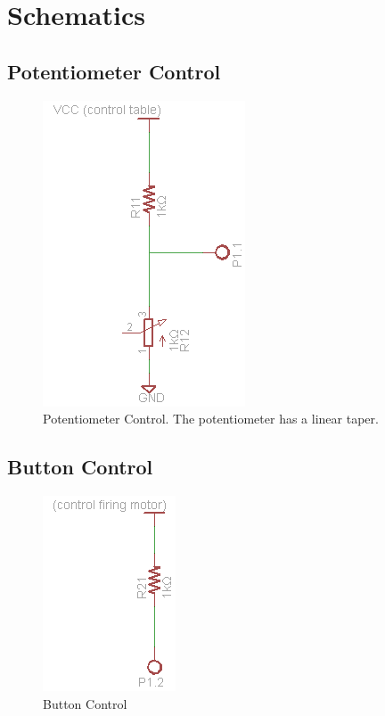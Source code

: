 \documentclass[a4paper, 11pt]{article}
\begin{document}
\section{Schematics}
	\subsection{Potentiometer Control}
	\begin{figure}[!ht]
		\centering
		\includegraphics{proposal-images/potentiometer-control}
		\caption{Potentiometer Control.  The potentiometer has a linear taper.}
	\end{figure}
	\subsection{Button Control}
	\begin{figure}[!ht]
		\centering
		\includegraphics{proposal-images/button-control}
		\caption{Button Control}
	\end{figure}
\end{document}
